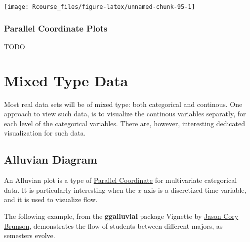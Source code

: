 \documentclass[]{book}
\theoremstyle{definition}
\theoremstyle{definition}
\theoremstyle{definition}
\theoremstyle{remark}
\begin{document}
\texttt{[image: Rcourse\_files/figure-latex/unnamed-chunk-95-1]}

\hypertarget{parcoord}{\subsubsection{Parallel Coordinate
Plots}\label{parcoord}}

TODO

\section{Mixed Type Data}\label{mixed-type-data}

Most real data sets will be of mixed type: both categorical and
continous. One approach to view such data, is to visualize the continous
variables separatly, for each level of the categorical variables. There
are, however, interesting dedicated visualization for such data.

\subsection{Alluvian Diagram}\label{alluvian-diagram}

An Alluvian plot is a type of \protect\hyperlink{parcoord}{Parallel
Coordinate} for multivariate categorical data. It is particularly
interesting when the \(x\) axis is a discretized time variable, and it
is used to visualize flow.

The following example, from the \textbf{ggalluvial} package Vignette by
\href{https://cran.r-project.org/web/packages/ggalluvial/vignettes/ggalluvial.html}{Jason
Cory Brunson}, demonstrates the flow of students between different
majors, as semesters evolve.
\end{document}
